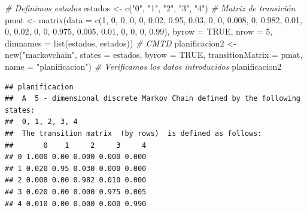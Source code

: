 \documentclass[
]{book}
\newenvironment{Shaded}{\begin{snugshade}}{\end{snugshade}}
\newcommand{\AttributeTok}[1]{\textcolor[rgb]{0.77,0.63,0.00}{#1}}
\newcommand{\CommentTok}[1]{\textcolor[rgb]{0.56,0.35,0.01}{\textit{#1}}}
\newcommand{\ConstantTok}[1]{\textcolor[rgb]{0.00,0.00,0.00}{#1}}
\newcommand{\DecValTok}[1]{\textcolor[rgb]{0.00,0.00,0.81}{#1}}
\newcommand{\FloatTok}[1]{\textcolor[rgb]{0.00,0.00,0.81}{#1}}
\newcommand{\FunctionTok}[1]{\textcolor[rgb]{0.00,0.00,0.00}{#1}}
\newcommand{\NormalTok}[1]{#1}
\newcommand{\OtherTok}[1]{\textcolor[rgb]{0.56,0.35,0.01}{#1}}
\newcommand{\StringTok}[1]{\textcolor[rgb]{0.31,0.60,0.02}{#1}}
\theoremstyle{definition}
\theoremstyle{definition}
\theoremstyle{definition}
\theoremstyle{definition}
\theoremstyle{remark}
\begin{document}
\begin{Shaded}
\begin{Highlighting}[]
\CommentTok{\# Definimos estados}
\NormalTok{estados }\OtherTok{\textless{}{-}} \FunctionTok{c}\NormalTok{(}\StringTok{"0"}\NormalTok{, }\StringTok{"1"}\NormalTok{, }\StringTok{"2"}\NormalTok{, }\StringTok{"3"}\NormalTok{, }\StringTok{"4"}\NormalTok{)}
\CommentTok{\# Matriz de transición }
\NormalTok{pmat }\OtherTok{\textless{}{-}} \FunctionTok{matrix}\NormalTok{(}\AttributeTok{data =} \FunctionTok{c}\NormalTok{(}\DecValTok{1}\NormalTok{, }\DecValTok{0}\NormalTok{, }\DecValTok{0}\NormalTok{, }\DecValTok{0}\NormalTok{, }\DecValTok{0}\NormalTok{,  }
                        \FloatTok{0.02}\NormalTok{, }\FloatTok{0.95}\NormalTok{, }\FloatTok{0.03}\NormalTok{, }\DecValTok{0}\NormalTok{, }\DecValTok{0}\NormalTok{, }
                        \FloatTok{0.008}\NormalTok{, }\DecValTok{0}\NormalTok{, }\FloatTok{0.982}\NormalTok{, }\FloatTok{0.01}\NormalTok{, }\DecValTok{0}\NormalTok{,   }
                        \FloatTok{0.02}\NormalTok{, }\DecValTok{0}\NormalTok{, }\DecValTok{0}\NormalTok{, }\FloatTok{0.975}\NormalTok{, }\FloatTok{0.005}\NormalTok{,}
                        \FloatTok{0.01}\NormalTok{, }\DecValTok{0}\NormalTok{, }\DecValTok{0}\NormalTok{, }\DecValTok{0}\NormalTok{, }\FloatTok{0.99}\NormalTok{), }
               \AttributeTok{byrow =} \ConstantTok{TRUE}\NormalTok{, }\AttributeTok{nrow =} \DecValTok{5}\NormalTok{, }
               \AttributeTok{dimnames =} \FunctionTok{list}\NormalTok{(estados, estados))}
\CommentTok{\# CMTD}
\NormalTok{planificacion2 }\OtherTok{\textless{}{-}} \FunctionTok{new}\NormalTok{(}\StringTok{"markovchain"}\NormalTok{, }\AttributeTok{states =}\NormalTok{ estados, }
                 \AttributeTok{byrow =} \ConstantTok{TRUE}\NormalTok{, }\AttributeTok{transitionMatrix =}\NormalTok{ pmat, }\AttributeTok{name =} \StringTok{"planificacion"}\NormalTok{)}
\CommentTok{\# Verificamos los datos introducidos}
\NormalTok{planificacion2}
\end{Highlighting}
\end{Shaded}

\begin{verbatim}
## planificacion 
##  A  5 - dimensional discrete Markov Chain defined by the following states: 
##  0, 1, 2, 3, 4 
##  The transition matrix  (by rows)  is defined as follows: 
##       0    1     2     3     4
## 0 1.000 0.00 0.000 0.000 0.000
## 1 0.020 0.95 0.030 0.000 0.000
## 2 0.008 0.00 0.982 0.010 0.000
## 3 0.020 0.00 0.000 0.975 0.005
## 4 0.010 0.00 0.000 0.000 0.990
\end{verbatim}
\end{document}
